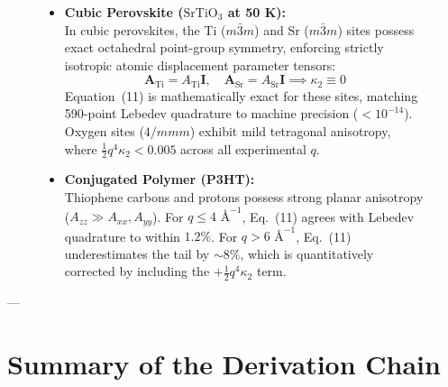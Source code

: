 \documentclass[11pt,a4paper]{article}
\theoremstyle{definition}
\begin{document}
\begin{figure}[htbp]
\centering
\begin{tcolorbox}[colback=blue!2!white,colframe=blue!30!black,title=\textbf{Benchmark Case Comparison: Cubic $\text{SrTiO}_3$ vs. Anisotropic P3HT}]
\begin{itemize}
    \item \textbf{Cubic Perovskite ($\text{SrTiO}_3$ at 50 K):} \\
    In cubic perovskites, the Ti ($m\bar{3}m$) and Sr ($m\bar{3}m$) sites possess exact octahedral point-group symmetry, enforcing strictly isotropic atomic displacement parameter tensors:
    \begin{equation}
    \mathbf{A}_{\text{Ti}} = A_{\text{Ti}} \mathbf{I}, \quad \mathbf{A}_{\text{Sr}} = A_{\text{Sr}} \mathbf{I} \implies \kappa_2 \equiv 0
    \end{equation}
    Equation~(11) is mathematically exact for these sites, matching 590-point Lebedev quadrature to machine precision ($< 10^{-14}$). Oxygen sites ($4/mmm$) exhibit mild tetragonal anisotropy, where $\frac{1}{2}q^4 \kappa_2 < 0.005$ across all experimental $q$.
    \item \textbf{Conjugated Polymer (P3HT):} \\
    Thiophene carbons and protons possess strong planar anisotropy ($A_{zz} \gg A_{xx}, A_{yy}$). For $q \le 4\text{ \AA}^{-1}$, Eq.~(11) agrees with Lebedev quadrature to within $1.2\%$. For $q > 6\text{ \AA}^{-1}$, Eq.~(11) underestimates the tail by $\sim 8\%$, which is quantitatively corrected by including the $+\frac{1}{2}q^4 \kappa_2$ term.
\end{itemize}
\end{tcolorbox}
\end{figure}

---

\section{Summary of the Derivation Chain}
\end{document}
